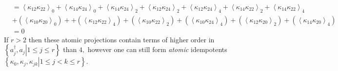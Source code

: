 \documentclass[aps,preprint]{revtex4}%
\begin{document}
\begin{align}
&  =\left\langle \kappa_{12}\kappa_{22}\right\rangle _{0}+\left\langle
\kappa_{14}\kappa_{24}\right\rangle _{0}+\left\langle \kappa_{14}\kappa
_{24}\right\rangle _{2}+\left\langle \kappa_{12}\kappa_{24}\right\rangle
_{2}+\left\langle \kappa_{12}\kappa_{24}\right\rangle _{4}+\left\langle
\kappa_{14}\kappa_{22}\right\rangle _{2}+\left\langle \kappa_{14}\kappa
_{22}\right\rangle _{4}\\
&  +\left(  \left\langle \kappa_{10}\kappa_{20}\right\rangle _{0}\right)
++\left(  \left\langle \kappa_{12}\kappa_{22}\right\rangle _{4}\right)
+\left(  \left\langle \kappa_{10}\kappa_{22}\right\rangle _{2}\right)
+\left(  \left\langle \kappa_{10}\kappa_{24}\right\rangle _{4}\right)
+\left(  \left\langle \kappa_{12}\kappa_{20}\right\rangle _{2}\right)
+\left(  \left\langle \kappa_{14}\kappa_{20}\right\rangle _{4}\right)  \\
&  =0
\end{align}
If $r>2$ then these atomic projections contain terms of higher order in
$\left\{  \left.  a_{j}^{\dagger},a_{j}\right\vert 1\leq j\leq r\right\}  $
than $4,$ however one can still form \emph{atomic }idempotents $\left\{
\left.  \kappa_{0},\kappa_{j},\kappa_{jk}\right\vert 1\leq j<k\leq r\right\}
.$%
\end{document}
